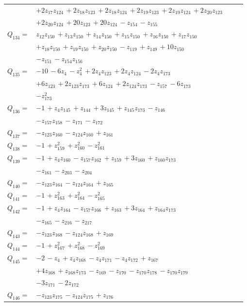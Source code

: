 \begin{longtable}{@{}r p{0.88\linewidth}@{}}
 & $+2z_{17}z_{124}\,+2z_{18}z_{123}\,+2z_{18}z_{124}\,+2z_{19}z_{123}\,+2z_{19}z_{124}\,+2z_{20}z_{123}$\\
 & $+2z_{20}z_{124}\,+20z_{123}\,+20z_{124}\,-z_{154}\,-z_{155}$\\[5pt]
$Q_{134}=$ & $z_{12}z_{150}\,+z_{13}z_{150}\,+z_{14}z_{150}\,+z_{15}z_{150}\,+z_{16}z_{150}\,+z_{17}z_{150}$\\
 & $+z_{18}z_{150}\,+z_{19}z_{150}\,+z_{20}z_{150}\,-z_{119}\,+z_{149}\,+10z_{150}$\\
 & $-z_{151}\,-z_{154}z_{156}$\\[5pt]
$Q_{135}=$ & $-10\,-6z_{4}\,-z_{4}^{2}\,+2z_{4}z_{123}\,+2z_{4}z_{124}\,-2z_{4}z_{173}$\\
 & $+6z_{123}\,+2z_{123}z_{173}\,+6z_{124}\,+2z_{124}z_{173}\,-z_{157}\,-6z_{173}$\\
 & $-z_{173}^{2}$\\[5pt]
$Q_{136}=$ & $-1\,+z_{4}z_{145}\,+z_{144}\,+3z_{145}\,+z_{145}z_{173}\,-z_{146}$\\
 & $-z_{157}z_{158}\,-z_{171}\,-z_{172}$\\[5pt]
$Q_{137}=$ & $-z_{123}z_{160}\,-z_{124}z_{160}\,+z_{161}$\\[5pt]
$Q_{138}=$ & $-1\,+z_{159}^{2}\,+z_{160}^{2}\,-z_{161}^{2}$\\[5pt]
$Q_{139}=$ & $-1\,+z_{4}z_{160}\,-z_{157}z_{162}\,+z_{159}\,+3z_{160}\,+z_{160}z_{173}$\\
 & $-z_{161}\,-z_{203}\,-z_{204}$\\[5pt]
$Q_{140}=$ & $-z_{123}z_{164}\,-z_{124}z_{164}\,+z_{165}$\\[5pt]
$Q_{141}=$ & $-1\,+z_{163}^{2}\,+z_{164}^{2}\,-z_{165}^{2}$\\[5pt]
$Q_{142}=$ & $-1\,+z_{4}z_{164}\,-z_{157}z_{166}\,+z_{163}\,+3z_{164}\,+z_{164}z_{173}$\\
 & $-z_{165}\,-z_{216}\,-z_{217}$\\[5pt]
$Q_{143}=$ & $-z_{123}z_{168}\,-z_{124}z_{168}\,+z_{169}$\\[5pt]
$Q_{144}=$ & $-1\,+z_{167}^{2}\,+z_{168}^{2}\,-z_{169}^{2}$\\[5pt]
$Q_{145}=$ & $-2\,-z_{4}\,+z_{4}z_{168}\,-z_{4}z_{171}\,-z_{4}z_{172}\,+z_{167}$\\
 & $+4z_{168}\,+z_{168}z_{173}\,-z_{169}\,-z_{170}\,-z_{170}z_{178}\,-z_{170}z_{179}$\\
 & $-3z_{171}\,-2z_{172}$\\[5pt]
$Q_{146}=$ & $-z_{123}z_{175}\,-z_{124}z_{175}\,+z_{176}$\\[5pt]

\end{longtable}
